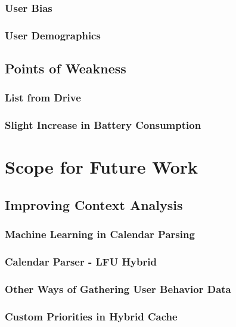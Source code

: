 \documentclass[12pt]{uthesis-v12}  %
\begin{document}
		\subsection{User Bias}
		
		\subsection{User Demographics}
	
	\section{Points of Weakness}		
		
		\subsection{List from Drive}
		
		\subsection{Slight Increase in Battery Consumption}
		
\chapter{Scope for Future Work}
		
	\section{Improving Context Analysis}
		
		\subsection{Machine Learning in Calendar Parsing}
		
		\subsection{Calendar Parser - LFU Hybrid}
		
		\subsection{Other Ways of Gathering User Behavior Data}
		
		\subsection{Custom Priorities in Hybrid Cache}
			
\end{document}
